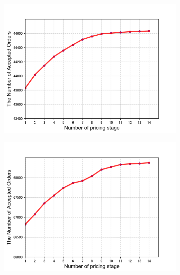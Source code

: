 \documentclass[sigconf,authordraft]{acmart}
\begin{document}
\begin{figure}[tb]
    \centering
    \begin{subfigure}[b]{0.2\textwidth}
    \includegraphics[width=\textwidth]{stagenumber-a.png}
  
    \end{subfigure}
    \quad
    \begin{subfigure}[b]{0.2\textwidth}
    \includegraphics[width=\textwidth]{stagenumber-b.png}
    \end{subfigure}
    

\end{figure}
\end{document}
